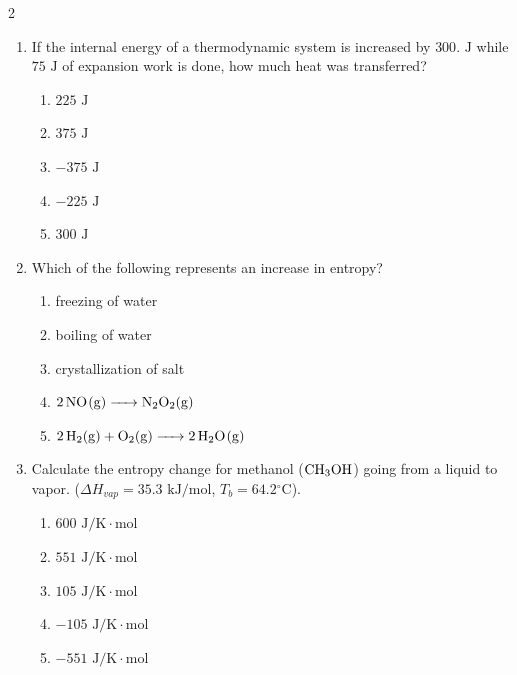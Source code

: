 \documentclass[12pt,letterpaper]{article}
\begin{document}
\begin{multicols*}{2}
\begin{enumerate}
        \item If the internal energy of a thermodynamic system is increased by $300\text{. J}$ while $75\text{ J}$ of expansion work is done, how much heat was transferred? %
            \begin{enumerate}
                \item $225\text{ J}$
                \item $375\text{ J}$
                \item $-375\text{ J}$
                \item $-225\text{ J}$
                \item $300\text{ J}$
            \end{enumerate}

        \item Which of the following represents an increase in entropy? %
            \begin{enumerate}
                \item freezing of water
                \item boiling of water
                \item crystallization of salt
                \item $\ce{2NO(g) -> N2O2(g)}$
                \item $\ce{2H2(g) + O2(g) -> 2H2O(g)}$
            \end{enumerate}

        \item Calculate the entropy change for methanol ($\ce{CH3OH}$) going from a liquid to vapor. ($\Delta H_{vap} = 35.3\text{ kJ/mol}$, $T_b = 64.2\text{}^\circ\text{C}$). %
            \begin{enumerate}
                \item $600\text{ J/K}\cdot\text{mol}$
                \item $551\text{ J/K}\cdot\text{mol}$
                \item $105\text{ J/K}\cdot\text{mol}$
                \item $-105\text{ J/K}\cdot\text{mol}$
                \item $-551\text{ J/K}\cdot\text{mol}$
            \end{enumerate}


\end{enumerate}
\end{multicols*}
\end{document}
